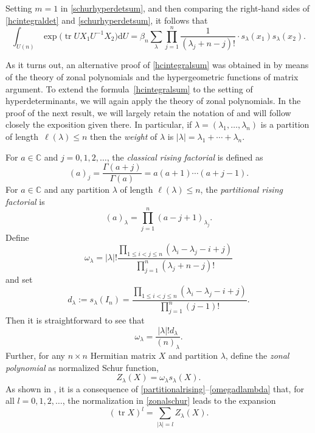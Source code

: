 \documentclass[10pt,a4paper]{amsart}
\numberwithin{equation}{section}
\def\C{{\mathbb C}}
\def\dd{ \mathrm{d}}
\def\tr{\operatorname{tr} }
\begin{document}
Setting $m=1$ in \eqref{schurhyperdetsum}, and then comparing the right-hand sides of \eqref{hcintegraldet} and \eqref{schurhyperdetsum}, it follows that
\begin{equation}
\int_{U(n)} \exp\bigl(\tr UX_1U^{-1}X_2\bigr) \dd U = \beta_n \sum_\lambda \prod_{j=1}^n \frac{1}{(\lambda_j + n-j)!} \cdot s_\lambda(x_1) s_\lambda(x_2).\label{hcintegralsum}
\end{equation}

As it turns out, an alternative proof of \eqref{hcintegralsum} was obtained in \cite{grossrichards89} by means of the theory of zonal polynomials and the hypergeometric functions of matrix argument. To extend the formula~\eqref{hcintegralsum} to the setting of hyperdeterminants, we will again apply the theory of zonal polynomials. In the proof of the next result, we will largely retain the notation of \cite[Section 2]{grossrichards89} and will follow closely the exposition given there. In particular, if $\lambda = (\lambda_1,\dots,\lambda_n)$ is a partition of length~${\ell(\lambda) \le n}$ then the {\it weight} of $\lambda$ is $|\lambda| = \lambda_1+\cdots+\lambda_n$.

For $a \in \C$ and $j = 0,1,2,\dots$, the {\it classical rising factorial} is defined as
\begin{equation}
(a)_j = \frac{\Gamma(a+j)}{\Gamma(a)} = a(a+1)\cdots (a+j-1).\label{classicalrising}
\end{equation}
For $a \in \C$ and any partition $\lambda$ of length $\ell(\lambda) \le n$, the {\it partitional rising factorial} is
\begin{equation}
(a)_\lambda = \prod_{j=1}^n (a-j+1)_{\lambda_j}.\label{partitionalrising}
\end{equation}
Define
\[%
\omega_\lambda = |\lambda|!
\frac{\prod_{1 \le i<j \le n} (\lambda_i-\lambda_j-i+j)}{\prod_{j=1}^n (\lambda_j+n-j)!}
\]
and set
\[%
d_\lambda := s_\lambda(I_n) = \frac{\prod_{1 \le i<j \le n} (\lambda_i-\lambda_j-i+j)}{\prod_{j=1}^n (j-1)!}.
\]
Then it is straightforward to see that
\begin{equation}
\omega_\lambda = \frac{|\lambda|! d_\lambda}{(n)_\lambda}.\label{omegadlambda}
\end{equation}
Further, for any $n \times n$ Hermitian matrix $X$ and partition $\lambda$, define the {\it zonal polynomial} as normalized Schur function,
\begin{equation}
Z_\lambda(X) = \omega_\lambda s_\lambda(X).\label{zonalschur}
\end{equation}
As shown in \cite[Section 2]{grossrichards89}, it is a consequence of \eqref{partitionalrising}--\eqref{omegadlambda} that, for all $l=0,1,2,\dots$, the normalization in \eqref{zonalschur} leads to the expansion
\begin{equation}
(\tr X)^l = \sum_{|\lambda| = l} Z_\lambda(X).\label{eq_tracepowers}
\end{equation}
\end{document}
